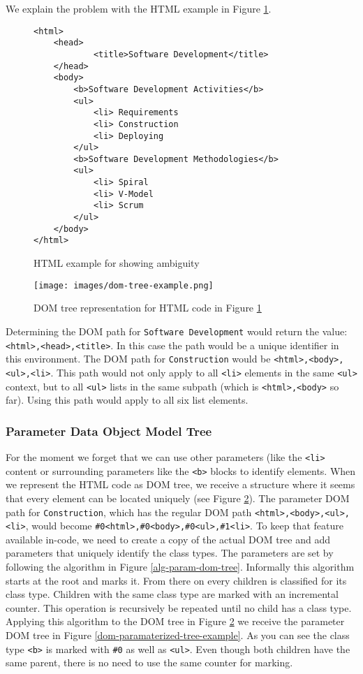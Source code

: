 We explain the problem with the HTML example in Figure \ref{dom-html-example}.

\begin{figure}
\begin{lstlisting}
<html>
	<head>
			<title>Software Development</title>
	</head>
	<body>
		<b>Software Development Activities</b>
		<ul>		
			<li> Requirements 
			<li> Construction 
			<li> Deploying		
		</ul>
		<b>Software Development Methodologies</b>
		<ul>		
			<li> Spiral
			<li> V-Model 
			<li> Scrum		
		</ul>
	</body>
</html>
\end{lstlisting}
\label{dom-html-example}
\caption{HTML example for showing ambiguity}
\end{figure}


\begin{figure}\centering
		\texttt{[image: images/dom-tree-example.png]}
		\caption{DOM tree representation for HTML code in Figure \ref{dom-html-example}}
		\label{dom-tree-example}
\end{figure} 

Determining the DOM path for \verb^Software Development^ would return the value: \verb^<html>,<head>,<title>^. In this case the path would be a unique identifier in this environment. 
The DOM path for \verb^Construction^ would be \verb^<html>,<body>,<ul>,<li>^. This path would not only apply to all \verb^<li>^ elements in the same \verb^<ul>^ context, but to all \verb^<ul>^ lists in the same subpath (which is \verb^<html>,<body>^ so far). Using this path would apply to all six list elements. 

\subsubsection{Parameter Data Object Model Tree}\label{param-dom-tree}

For the moment we forget that we can use other parameters (like the \verb^<li>^ content or surrounding parameters like the \verb^<b>^ blocks to identify elements. 
When we represent the HTML code as DOM tree, we receive a structure where it seems that every element can be located uniquely (see Figure \ref{dom-tree-example}). The parameter DOM path for \verb^Construction^, which has the regular DOM path \verb^<html>,<body>,<ul>,<li>^, would become \verb^#0<html>,#0<body>,#0<ul>,#1<li>^. 
To keep that feature available in-code, we need to create a copy of the actual DOM tree and add parameters that uniquely identify the class types. 
The parameters are set by following the algorithm in Figure \ref{alg-param-dom-tree}. Informally this algorithm starts at the root and marks it. From there on every children is classified for its class type. Children with the same class type are marked with an incremental counter. This operation is recursively be repeated until no child has a class type. 
Applying this algorithm to the DOM tree in Figure \ref{dom-tree-example} we receive the parameter DOM tree in Figure \ref{dom-paramaterized-tree-example}. As you can see the class type \verb^<b>^ is marked with \verb^#0^ as well as \verb^<ul>^. Even though both children have the same parent, there is no need to use the same counter for marking.

